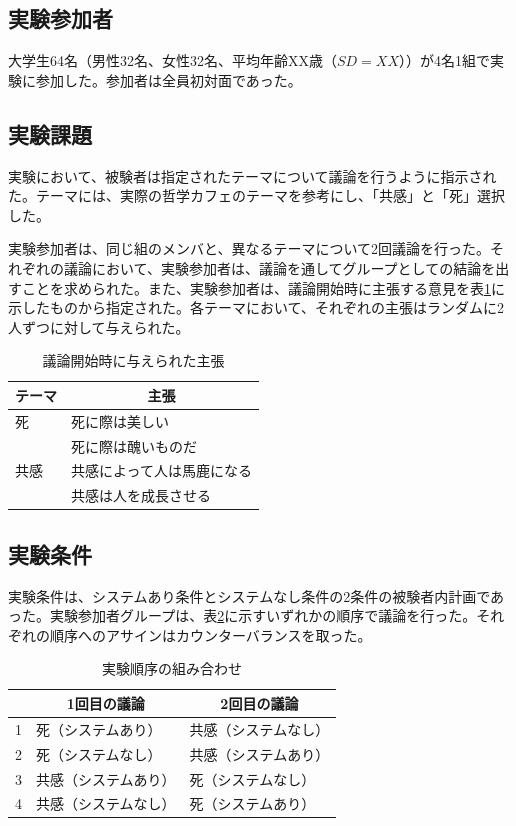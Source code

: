 \documentclass[11pt, a4paper]{jreport} %
\begin{document}
\subsection{実験参加者}
大学生64名（男性32名、女性32名、平均年齢XX歳（$SD=XX$））が4名1組で実験に参加した。参加者は全員初対面であった。
\subsection{実験課題}
実験において、被験者は指定されたテーマについて議論を行うように指示された。テーマには、実際の哲学カフェのテーマを参考にし、「共感」と「死」選択した。


実験参加者は、同じ組のメンバと、異なるテーマについて2回議論を行った。それぞれの議論において、実験参加者は、議論を通してグループとしての結論を出すことを求められた。また、実験参加者は、議論開始時に主張する意見を表\ref{tab:始めの意見}に示したものから指定された。各テーマにおいて、それぞれの主張はランダムに2人ずつに対して与えられた。

\begin{table}[]
\caption{議論開始時に与えられた主張}
\centering
\begin{tabular}{@{}ll@{}}
\toprule
テーマ & \multicolumn{1}{c}{主張} \\ \midrule
死    & 死に際は美しい                \\
     & 死に際は醜いものだ              \\
共感   & 共感によって人は馬鹿になる          \\
     & 共感は人を成長させる             \\ \bottomrule
\end{tabular}
\label{tab:始めの意見}
\end{table}




\subsection{実験条件}
実験条件は、システムあり条件とシステムなし条件の2条件の被験者内計画であった。実験参加者グループは、表\ref{tab:順序}に示すいずれかの順序で議論を行った。それぞれの順序へのアサインはカウンターバランスを取った。

\begin{table}[]
\caption{実験順序の組み合わせ}
\centering
\label{tab:順序}
\begin{tabular}{@{}lll@{}}
\toprule
  & \multicolumn{1}{c}{1回目の議論} & \multicolumn{1}{c}{2回目の議論} \\ \midrule
1 & 死（システムあり）                  & 共感（システムなし）                 \\
2 & 死（システムなし）                  & 共感（システムあり）                 \\
3 & 共感（システムあり）                 & 死（システムなし）                  \\
4 & 共感（システムなし）                 & 死（システムあり）                  \\ \bottomrule
\end{tabular}
\end{table}
\end{document}
